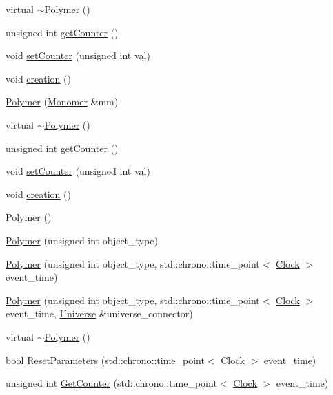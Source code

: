 \begin{DoxyCompactItemize}
\item 
virtual \hyperlink{class_polymer_aac2b3983f375a5691c7d5ca1a79594d5}{$\sim$\+Polymer} ()
\item 
unsigned int \hyperlink{class_polymer_a8346d821e5f8690d7816ba1d40036b69}{get\+Counter} ()
\item 
void \hyperlink{class_polymer_a7ed6bbe09a570b59f9253d63fd3326d2}{set\+Counter} (unsigned int val)
\item 
void \hyperlink{class_polymer_a1daba3eb2ba8428bf2f3e814668b155f}{creation} ()
\item 
\hyperlink{class_polymer_ae77454a3908652e4df6a26b9cac509a5}{Polymer} (\hyperlink{class_monomer}{Monomer} \&mm)
\item 
virtual \hyperlink{class_polymer_aac2b3983f375a5691c7d5ca1a79594d5}{$\sim$\+Polymer} ()
\item 
unsigned int \hyperlink{class_polymer_a8346d821e5f8690d7816ba1d40036b69}{get\+Counter} ()
\item 
void \hyperlink{class_polymer_a7ed6bbe09a570b59f9253d63fd3326d2}{set\+Counter} (unsigned int val)
\item 
void \hyperlink{class_polymer_a1daba3eb2ba8428bf2f3e814668b155f}{creation} ()
\item 
\hyperlink{class_polymer_a0f7d915300bfec223c4025f8e9d4f46d}{Polymer} ()
\item 
\hyperlink{class_polymer_adb35b8b7a5eae1e39187c0e525b0d9b1}{Polymer} (unsigned int object\+\_\+type)
\item 
\hyperlink{class_polymer_af918b8776cfd76d9ae4611bf35d4192a}{Polymer} (unsigned int object\+\_\+type, std\+::chrono\+::time\+\_\+point$<$ \hyperlink{universe_8h_a0ef8d951d1ca5ab3cfaf7ab4c7a6fd80}{Clock} $>$ event\+\_\+time)
\item 
\hyperlink{class_polymer_a53797e297c95b3bd934e1b8dd8c0c399}{Polymer} (unsigned int object\+\_\+type, std\+::chrono\+::time\+\_\+point$<$ \hyperlink{universe_8h_a0ef8d951d1ca5ab3cfaf7ab4c7a6fd80}{Clock} $>$ event\+\_\+time, \hyperlink{class_universe}{Universe} \&universe\+\_\+connector)
\item 
virtual \hyperlink{class_polymer_aac2b3983f375a5691c7d5ca1a79594d5}{$\sim$\+Polymer} ()
\item 
bool \hyperlink{class_polymer_aa20f1e5c79e8631afa291569d5030103}{Reset\+Parameters} (std\+::chrono\+::time\+\_\+point$<$ \hyperlink{universe_8h_a0ef8d951d1ca5ab3cfaf7ab4c7a6fd80}{Clock} $>$ event\+\_\+time)
\item 
unsigned int \hyperlink{class_polymer_ac33903f9b5d2c73d6ddadcb02ece323e}{Get\+Counter} (std\+::chrono\+::time\+\_\+point$<$ \hyperlink{universe_8h_a0ef8d951d1ca5ab3cfaf7ab4c7a6fd80}{Clock} $>$ event\+\_\+time)

\end{DoxyCompactItemize}
